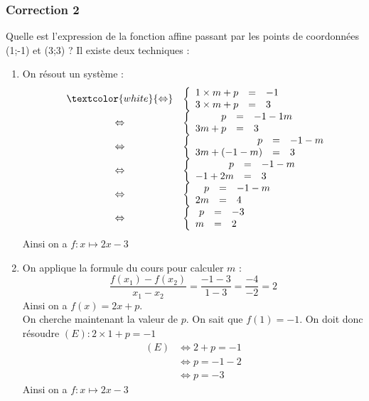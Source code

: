 \documentclass[15pt, mathserif]{beamer}
\begin{document}
\begin{frame}
\vspace{-10mm}
	\frametitle{Correction 2}
\vspace*{1cm} 
 \footnotesize{Quelle est l'expression de la fonction affine passant par les points de coordonnées (1;-1) et (3;3) ? Il existe deux techniques :} 
 \begin{multicols}{2} 
 \begin{enumerate} 
 \item On résout un système : $$ \begin{array}{rcl} 
 & \textcolor{white}{\Leftrightarrow} & 
 \left 
 \{\begin{array}{rcl}1\times m + p&=&-1 \\ 
 3\times m+p&=&3\end{array} \right. \\ 
 &\Leftrightarrow & \left 
 \{\begin{array}{rcl} p&=&-1-1m \\ 
 3m+p&=&3\end{array} \right. \\ 
 &\Leftrightarrow & \left 
 \{\begin{array}{rcl} p&=&-1-m \\ 
 3m+(-1-m) &=&3\end{array} \right. \\ &\Leftrightarrow& \left \{\begin{array}{rcl}p&=&-1-m \\ 
 -1+2m&=&3\end{array} \right. \\ &\Leftrightarrow& \left \{\begin{array}{rcl}p&=&-1-m \\ 
 2m&=&4\end{array} \right. \\  &\Leftrightarrow& \left \{\begin{array}{rcl} p&=&-3 \\  m&=&2\end{array}\right. \end{array}$$ 
 Ainsi on a $f:x\mapsto 2x-3$ 
 \columnbreak 
 \item 
 \footnotesize{On applique la formule du cours pour calculer $m$ :$$ \dfrac{f(x_1)-f(x_2)}{x_1-x_2}=\dfrac{-1-3}{1-3}= \dfrac{-4}{-2}=2$$} \footnotesize{ Ainsi on a $f(x)= 2x +p $. 
  \\ On cherche maintenant la valeur de $p$. On sait que $f(1)=-1$. On doit donc résoudre $(E): 2\times1+p=-1$}	 
 \begin{align*} (E)& \Leftrightarrow 2+p=-1\\
		 	 & \Leftrightarrow p=-1-2\\
			 & \Leftrightarrow p=-3
	 \end{align*} 
 Ainsi on a $f:x\mapsto 2x-3$ 
 \end{enumerate} 
 \end{multicols} 
 \end{frame}
\end{document}

